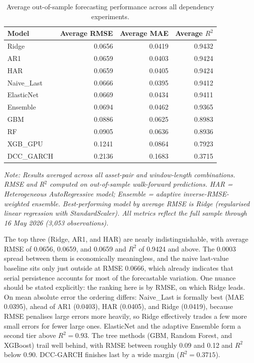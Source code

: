 \begin{table}[H]
    \centering
    \caption{Average out-of-sample forecasting performance across all dependency experiments.}
    \label{tab:model_ranking_summary}
    \begin{tabular}{lrrr}
        \toprule
        Model & Average RMSE & Average MAE & Average $R^2$ \\
        \midrule
        Ridge      & 0.0656 & 0.0419 & 0.9432 \\
        AR1        & 0.0659 & 0.0403 & 0.9424 \\
        HAR        & 0.0659 & 0.0405 & 0.9424 \\
        Naive\_Last & 0.0666 & 0.0395 & 0.9412 \\
        ElasticNet & 0.0669 & 0.0434 & 0.9411 \\
        Ensemble   & 0.0694 & 0.0462 & 0.9365 \\
        GBM        & 0.0886 & 0.0625 & 0.8983 \\
        RF         & 0.0905 & 0.0636 & 0.8936 \\
        XGB\_GPU   & 0.1241 & 0.0864 & 0.7923 \\
        DCC\_GARCH & 0.2136 & 0.1683 & 0.3715 \\
        \bottomrule
    \end{tabular}
    \par\smallskip\noindent\footnotesize{\textit{Note: Results averaged across all asset-pair and window-length combinations. RMSE and R$^2$ computed on out-of-sample walk-forward predictions. HAR = Heterogeneous AutoRegressive model; Ensemble = adaptive inverse-RMSE-weighted ensemble. Best-performing model by average RMSE is Ridge (regularised linear regression with StandardScaler). All metrics reflect the full sample through 16 May 2026 (3{,}053 observations).}}
\end{table}

The top three (Ridge, AR1, and HAR) are nearly indistinguishable, with average RMSE of 0.0656, 0.0659, and 0.0659 and $R^2$ of 0.9424 and above. The 0.0003 spread between them is economically meaningless, and the naive last-value baseline sits only just outside at RMSE 0.0666, which already indicates that serial persistence accounts for most of the forecastable variation. One nuance should be stated explicitly: the ranking here is by RMSE, on which Ridge leads. On mean absolute error the ordering differs: Naive\_Last is formally best (MAE 0.0395), ahead of AR1 (0.0403), HAR (0.0405), and Ridge (0.0419), because RMSE penalises large errors more heavily, so Ridge effectively trades a few more small errors for fewer large ones. ElasticNet and the adaptive Ensemble form a second tier above $R^2 = 0.93$. The tree methods (GBM, Random Forest, and XGBoost) trail well behind, with RMSE between roughly 0.09 and 0.12 and $R^2$ below 0.90. DCC-GARCH finishes last by a wide margin ($R^2 = 0.3715$).

